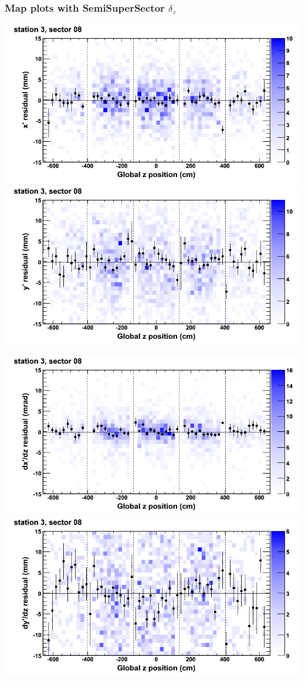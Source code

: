 \documentclass[compress]{beamer}
\begin{document}
\begin{frame}
\frametitle{Map plots with SemiSuperSector $\delta_z$}
\includegraphics[width=0.5\linewidth]{zfit_mapplots/DTvsz_st3sec08_x.png}
\includegraphics[width=0.5\linewidth]{zfit_mapplots/DTvsz_st3sec08_y.png}

\includegraphics[width=0.5\linewidth]{zfit_mapplots/DTvsz_st3sec08_dxdz.png}
\includegraphics[width=0.5\linewidth]{zfit_mapplots/DTvsz_st3sec08_dydz.png}
\end{frame}
\end{document}
